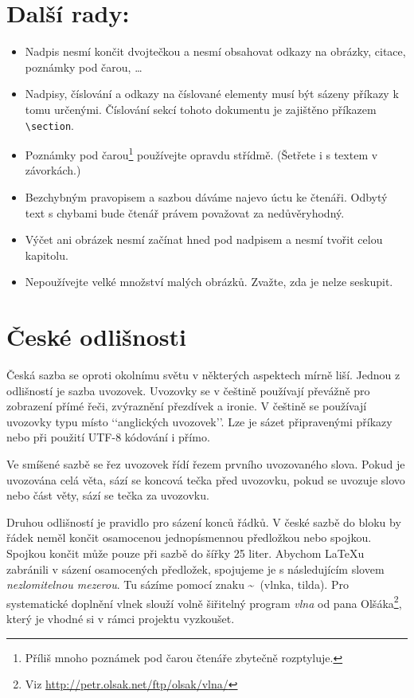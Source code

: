 \documentclass[10pt, twocolumn]{article}
\begin{document}
\section{Další rady:}
\begin{itemize}
    \item Nadpis nesmí končit dvojtečkou a nesmí obsahovat odkazy na obrázky, citace, poznámky pod čarou, \dots
    \item Nadpisy, číslování a odkazy na číslované elementy musí být sázeny příkazy k tomu určenými. Číslování sekcí tohoto dokumentu je zajištěno příkazem
    \verb|\section|.
    \item Poznámky pod čarou\footnote{Příliš mnoho poznámek pod čarou čtenáře zbytečně rozptyluje.} používejte opravdu střídmě.
    (Šetřete i s textem v závorkách.)
    \item Bezchybným pravopisem a sazbou dáváme najevo
    úctu ke čtenáři. Odbytý text s chybami bude čtenář
    právem považovat za nedůvěryhodný.
    \item Výčet ani obrázek nesmí začínat hned pod nadpisem
    a nesmí tvořit celou kapitolu.
    \item Nepoužívejte velké množství malých obrázků. Zvažte, zda je nelze seskupit.
\end{itemize}
\section{České odlišnosti}
Česká sazba se oproti okolnímu světu v některých aspektech mírně liší. Jednou z odlišností je sazba uvozovek. Uvozovky se v češtině používají převážně pro zobrazení přímé
řeči, zvýraznění přezdívek a ironie. V češtině se používají
uvozovky typu\,\,místo ‘‘anglických uvozovek’’. Lze je
sázet připravenými příkazy nebo při použití UTF-8 kódování i přímo.

Ve smíšené sazbě se řez uvozovek řídí řezem prvního
uvozovaného slova. Pokud je uvozována celá věta, sází se
koncová tečka před uvozovku, pokud se uvozuje slovo nebo
část věty, sází se tečka za uvozovku.

Druhou odlišností je pravidlo pro sázení konců řádků.
V české sazbě do bloku by řádek neměl končit osamocenou jednopísmennou předložkou nebo spojkou. Spojkou
 končit může pouze při sazbě do šířky 25 liter. Abychom \LaTeX u zabránili v sázení osamocených předložek, spojujeme je s následujícím slovem \emph{nezlomitelnou mezerou}. Tu
sázíme pomocí znaku \textasciitilde \ (vlnka, tilda). 
Pro systematické doplnění vlnek slouží volně šiřitelný program \emph{vlna} od pana
Olšáka\footnote{Viz \href{http://petr.olsak.net/ftp/olsak/vlna/}{http://petr.olsak.net/ftp/olsak/vlna/}  }, který je vhodné si v rámci projektu vyzkoušet.
\end{document}
